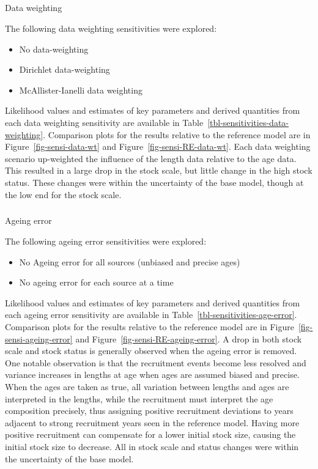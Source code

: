 \documentclass[
]{scrartcl}
\makeatletter
\let\oldsubparagraph\subparagraph
\renewcommand{\subparagraph}{
    \@ifstar
      \xxxSubParagraphStar
      \xxxSubParagraphNoStar
  }
\newcommand{\xxxSubParagraphStar}[1]{\oldsubparagraph*{#1}\mbox{}}
\newcommand{\xxxSubParagraphNoStar}[1]{\oldsubparagraph{#1}\mbox{}}
\providecommand{\tightlist}{%
  \setlength{\itemsep}{0pt}\setlength{\parskip}{0pt}}\usepackage{longtable,booktabs,array}
\makeatother
\begin{document}
\subparagraph{Data weighting}\label{data-weighting-1}

The following data weighting sensitivities were explored:

\begin{itemize}
\tightlist
\item
  No data-weighting
\item
  Dirichlet data-weighting
\item
  McAllister-Ianelli data weighting
\end{itemize}

Likelihood values and estimates of key parameters and derived quantities
from each data weighting sensitivity are available in
Table~\ref{tbl-sensitivities-data-weighting}. Comparison plots for the
results relative to the reference model are in
Figure~\ref{fig-sensi-data-wt} and Figure~\ref{fig-sensi-RE-data-wt}.
Each data weighting scenario up-weighted the influence of the length
data relative to the age data. This resulted in a large drop in the
stock scale, but little change in the high stock status. These changes
were within the uncertainty of the base model, though at the low end for
the stock scale.

\subparagraph{Ageing error}\label{ageing-error}

The following ageing error sensitivities were explored:

\begin{itemize}
\tightlist
\item
  No Ageing error for all sources (unbiased and precise ages)
\item
  No ageing error for each source at a time
\end{itemize}

Likelihood values and estimates of key parameters and derived quantities
from each ageing error sensitivity are available in
Table~\ref{tbl-sensitivities-age-error}. Comparison plots for the
results relative to the reference model are in
Figure~\ref{fig-sensi-ageing-error} and
Figure~\ref{fig-sensi-RE-ageing-error}. A drop in both stock scale and
stock status is generally observed when the ageing error is removed. One
notable observation is that the recruitment events become less resolved
and variance increases in lengths at age when ages are assumed biased
and precise. When the ages are taken as true, all variation between
lengths and ages are interpreted in the lengths, while the recruitment
must interpret the age composition precisely, thus assigning positive
recruitment deviations to years adjacent to strong recruitment years
seen in the reference model. Having more positive recruitment can
compensate for a lower initial stock size, causing the initial stock
size to decrease. All in stock scale and status changes were within the
uncertainty of the base model.
\end{document}
